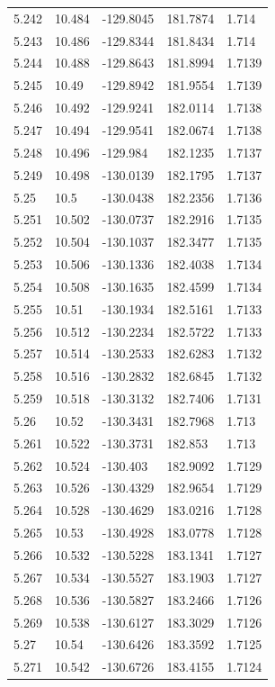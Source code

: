 \begin{tabular}{lllll}
5.242 & 10.484 & -129.8045 & 181.7874 & 1.714 \\
5.243 & 10.486 & -129.8344 & 181.8434 & 1.714 \\
5.244 & 10.488 & -129.8643 & 181.8994 & 1.7139 \\
5.245 & 10.49 & -129.8942 & 181.9554 & 1.7139 \\
5.246 & 10.492 & -129.9241 & 182.0114 & 1.7138 \\
5.247 & 10.494 & -129.9541 & 182.0674 & 1.7138 \\
5.248 & 10.496 & -129.984 & 182.1235 & 1.7137 \\
5.249 & 10.498 & -130.0139 & 182.1795 & 1.7137 \\
5.25 & 10.5 & -130.0438 & 182.2356 & 1.7136 \\
5.251 & 10.502 & -130.0737 & 182.2916 & 1.7135 \\
5.252 & 10.504 & -130.1037 & 182.3477 & 1.7135 \\
5.253 & 10.506 & -130.1336 & 182.4038 & 1.7134 \\
5.254 & 10.508 & -130.1635 & 182.4599 & 1.7134 \\
5.255 & 10.51 & -130.1934 & 182.5161 & 1.7133 \\
5.256 & 10.512 & -130.2234 & 182.5722 & 1.7133 \\
5.257 & 10.514 & -130.2533 & 182.6283 & 1.7132 \\
5.258 & 10.516 & -130.2832 & 182.6845 & 1.7132 \\
5.259 & 10.518 & -130.3132 & 182.7406 & 1.7131 \\
5.26 & 10.52 & -130.3431 & 182.7968 & 1.713 \\
5.261 & 10.522 & -130.3731 & 182.853 & 1.713 \\
5.262 & 10.524 & -130.403 & 182.9092 & 1.7129 \\
5.263 & 10.526 & -130.4329 & 182.9654 & 1.7129 \\
5.264 & 10.528 & -130.4629 & 183.0216 & 1.7128 \\
5.265 & 10.53 & -130.4928 & 183.0778 & 1.7128 \\
5.266 & 10.532 & -130.5228 & 183.1341 & 1.7127 \\
5.267 & 10.534 & -130.5527 & 183.1903 & 1.7127 \\
5.268 & 10.536 & -130.5827 & 183.2466 & 1.7126 \\
5.269 & 10.538 & -130.6127 & 183.3029 & 1.7126 \\
5.27 & 10.54 & -130.6426 & 183.3592 & 1.7125 \\
5.271 & 10.542 & -130.6726 & 183.4155 & 1.7124 \\

\end{tabular}
